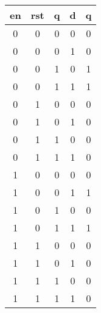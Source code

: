 \begin{tabular}{*{4}{c}|c}
    en&   rst&     q&     d&  q \\
\hline
    0 &    0 &    0 &    0 &  0 \\
    0 &    0 &    0 &    1 &  0 \\
    0 &    0 &    1 &    0 &  1 \\
    0 &    0 &    1 &    1 &  1 \\
    0 &    1 &    0 &    0 &  0 \\
    0 &    1 &    0 &    1 &  0 \\
    0 &    1 &    1 &    0 &  0 \\
    0 &    1 &    1 &    1 &  0 \\
    1 &    0 &    0 &    0 &  0 \\
    1 &    0 &    0 &    1 &  1 \\
    1 &    0 &    1 &    0 &  0 \\
    1 &    0 &    1 &    1 &  1 \\
    1 &    1 &    0 &    0 &  0 \\
    1 &    1 &    0 &    1 &  0 \\
    1 &    1 &    1 &    0 &  0 \\
    1 &    1 &    1 &    1 &  0 \\
\end{tabular}
